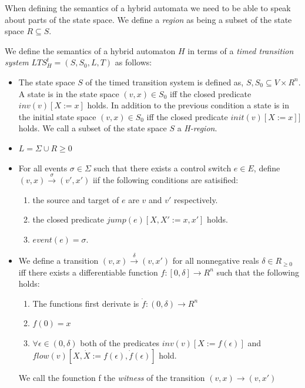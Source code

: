 When defining the semantics of a hybrid automata we need to be able to speak about parts of the state space.  We define a \emph{region} as being a subset of the state space $R \subseteq S$.

\begin{mydef}
We define the semantics of a hybrid automaton $H$ in terms of a \emph{timed transition system} $LTS^t_H = (S,S_0,L,T)$ as follows:


\begin{itemize}
 
\item The state space $S$ of the timed transition system is defined as, $S, S_0 \subseteq V \times R^n$. A state is in the state space $(v,x) \in S_0$ iff the closed predicate $inv(v)[X := x]$ holds. In addition to the previous condition a state is in the initial state space $(v,x) \in S_0$ iff the closed predicate $init(v)[X := x]]$ holds. We call a subset of the state space $S$ a \emph{H-region}.


\item $L = \Sigma \cup R {\geq 0}$

\item For all events $\sigma \in \Sigma$ such that there exists a control switch $e \in E$, define $(v,x) \xrightarrow{\sigma} (v',x')$ iif the following conditions are satisified:
\begin{enumerate}
\item the source and target of $e$ are $v$ and $v'$ respectively. 
\item the closed predicate $jump(e)[X, X' := x,x']$ holds.
\item $event(e) = \sigma$.
\end{enumerate}

\item We define a transition $(v,x) \xrightarrow{\delta} (v,x')$ for all nonnegative reals $\delta \in R_{\geq 0}$ iff there exists a differentiable function $f: [0, \delta] \to R^n$ such that the following holds:
\begin{enumerate}
\item The functions first derivate is $\dot{f} :(0,\delta) \to R^n$
\item $f(0) = x$
\item $\forall \epsilon \in (0,\delta)$ both of the predicates $inv(v)[X := f(\epsilon)]$ and $flow(v)[X,\dot{X} := f(\epsilon),\dot{f}(\epsilon)]$ hold.
\end{enumerate}
We call the founction f the \emph{witness} of the transition $(v,x) \to (v, x')$

\end{itemize}


\end{mydef}

